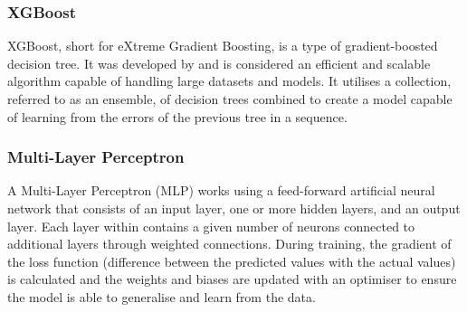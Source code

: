 \subsubsection{XGBoost}

XGBoost, short for eXtreme Gradient Boosting, is a type of gradient-boosted decision tree. It was developed by \textcite{XGBoost} and is considered an efficient and scalable algorithm capable of handling large datasets and models. It utilises a collection, referred to as an ensemble, of decision trees combined to create a model capable of learning from the errors of the previous tree in a sequence. 

\subsubsection{Multi-Layer Perceptron}

A Multi-Layer Perceptron (MLP) works using a feed-forward artificial neural network that consists of an input layer, one or more hidden layers, and an output layer. Each layer within contains a given number of neurons connected to additional layers through weighted connections. During training, the gradient of the loss function (difference between the predicted values with the actual values) is calculated and the weights and biases are updated with an optimiser to ensure the model is able to generalise and learn from the data.